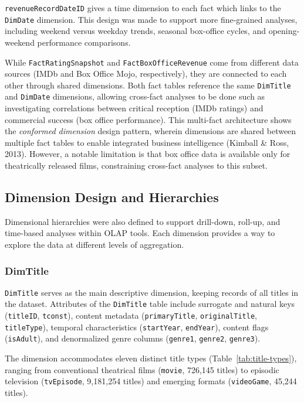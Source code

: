 \texttt{revenueRecordDateID} gives a time dimension to each fact which links to the \texttt{DimDate} dimension. This design was made to support more fine-grained analyses, including weekend versus weekday trends, seasonal box-office cycles, and opening-weekend performance comparisons.

While \texttt{FactRatingSnapshot} and \texttt{FactBoxOfficeRevenue} come from different data sources (IMDb and Box Office Mojo, respectively), they are connected to each other through shared dimensions. Both fact tables reference the same \texttt{DimTitle} and \texttt{DimDate} dimensions, allowing cross-fact analyses to be done such as investigating correlations between critical reception (IMDb ratings) and commercial success (box office performance). This multi-fact architecture shows the \textit{conformed dimension} design pattern, wherein dimensions are shared between multiple fact tables to enable integrated business intelligence (Kimball \& Ross, 2013). However, a notable limitation is that box office data is available only for theatrically released films, constraining cross-fact analyses to this subset.

\subsection{Dimension Design and Hierarchies}

Dimensional hierarchies were also defined to support drill-down, roll-up, and time-based analyses within OLAP tools. Each dimension provides a way to explore the data at different levels of aggregation.

\subsubsection{DimTitle}

\texttt{DimTitle} serves as the main descriptive dimension, keeping records of all titles in the dataset. Attributes of the \texttt{DimTitle} table include surrogate and natural keys (\texttt{titleID}, \texttt{tconst}), content metadata (\texttt{primaryTitle}, \texttt{originalTitle}, \texttt{titleType}), temporal characteristics (\texttt{startYear}, \texttt{endYear}), content flags (\texttt{isAdult}), and denormalized genre columns (\texttt{genre1}, \texttt{genre2}, \texttt{genre3}).

The dimension accommodates eleven distinct title types (Table~\ref{tab:title-types}), ranging from conventional theatrical films (\texttt{movie}, 726,145 titles) to episodic television (\texttt{tvEpisode}, 9,181,254 titles) and emerging formats (\texttt{videoGame}, 45,244 titles).

